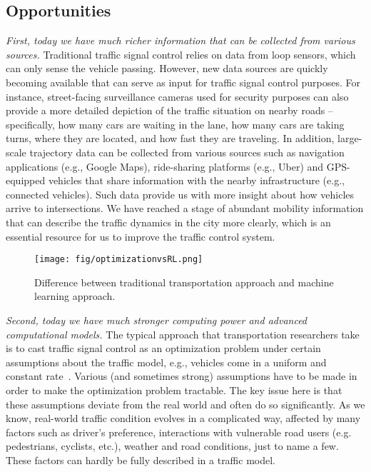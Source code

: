 \subsection{Opportunities}
\emph{First, today we have much richer information that can be collected from various sources.} Traditional traffic signal control relies on data from loop sensors, which can only sense the vehicle passing. However, new data sources are quickly becoming available that can serve as input for traffic signal control purposes. For instance, street-facing surveillance cameras used for security purposes can also provide a more detailed depiction of  the traffic situation on nearby roads -- specifically, how many cars are waiting in the lane, how many cars are taking turns, where they are located, and how fast they are traveling. In addition, large-scale trajectory data can be collected from various sources such as navigation applications (e.g., Google Maps),  ride-sharing platforms (e.g., Uber) and GPS-equipped vehicles that share information with the nearby infrastructure (e.g., connected vehicles). Such data provide us with more insight about how vehicles arrive to intersections. We have reached a stage of abundant mobility information that can describe the traffic dynamics in the city more clearly, which is an essential resource for us to improve the traffic control system.


 
\begin{figure}[htbp]
\centering
\texttt{[image: fig/optimizationvsRL.png]}
\caption{Difference between traditional transportation approach and machine learning approach.}
\label{fig:optvsrl}
\end{figure}

\emph{Second, today we have much stronger computing power and advanced computational models.} The typical approach that transportation researchers take is to cast traffic signal control as an optimization problem under certain assumptions about the traffic model, e.g., vehicles come in a uniform and constant rate~\cite{RPM04}.  Various (and sometimes strong) assumptions have to be made in order to make the optimization problem tractable. The key issue here is that these assumptions deviate from the real world and often do so significantly. As we know, real-world traffic condition evolves in a complicated way, affected by many factors such as driver's preference, interactions with vulnerable road users (e.g. pedestrians, cyclists, etc.), weather and road conditions, just to name a few. These factors can hardly be fully described in a traffic model.


